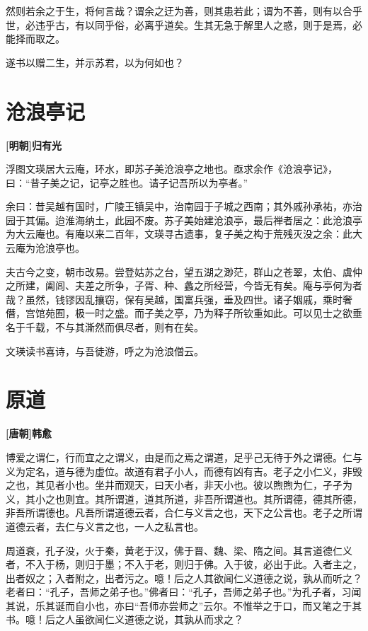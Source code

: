 \documentclass[UTF8,titlepage,oneside]{ctexbook}
\begin{document}
然则若余之于生，将何言哉？谓余之迂为善，则其患若此；谓为不善，则有以合乎世，必违乎古，有以同乎俗，必离乎道矣。生其无急于解里人之惑，则于是焉，必能择而取之。


遂书以赠二生，并示苏君，以为何如也？



\chapter*{沧浪亭记}
\begin{center}
	\textbf{[明朝]归有光}
\end{center}


浮图文瑛居大云庵，环水，即苏子美沧浪亭之地也。亟求余作《沧浪亭记》，曰：“昔子美之记，记亭之胜也。请子记吾所以为亭者。”


余曰：昔吴越有国时，广陵王镇吴中，治南园于子城之西南；其外戚孙承祐，亦治园于其偏。迨淮海纳土，此园不废。苏子美始建沧浪亭，最后禅者居之：此沧浪亭为大云庵也。有庵以来二百年，文瑛寻古遗事，复子美之构于荒残灭没之余：此大云庵为沧浪亭也。


夫古今之变，朝市改易。尝登姑苏之台，望五湖之渺茫，群山之苍翠，太伯、虞仲之所建，阖闾、夫差之所争，子胥、种、蠡之所经营，今皆无有矣。庵与亭何为者哉？虽然，钱镠因乱攘窃，保有吴越，国富兵强，垂及四世。诸子姻戚，乘时奢僭，宫馆苑囿，极一时之盛。而子美之亭，乃为释子所钦重如此。可以见士之欲垂名于千载，不与其澌然而俱尽者，则有在矣。


文瑛读书喜诗，与吾徒游，呼之为沧浪僧云。



\chapter*{原道}
\begin{center}
	\textbf{[唐朝]韩愈}
\end{center}

博爱之谓仁，行而宜之之谓义，由是而之焉之谓道，足乎己无待于外之谓德。仁与义为定名，道与德为虚位。故道有君子小人，而德有凶有吉。老子之小仁义，非毁之也，其见者小也。坐井而观天，曰天小者，非天小也。彼以煦煦为仁，孑孑为义，其小之也则宜。其所谓道，道其所道，非吾所谓道也。其所谓德，德其所德，非吾所谓德也。凡吾所谓道德云者，合仁与义言之也，天下之公言也。老子之所谓道德云者，去仁与义言之也，一人之私言也。

周道衰，孔子没，火于秦，黄老于汉，佛于晋、魏、梁、隋之间。其言道德仁义者，不入于杨，则归于墨；不入于老，则归于佛。入于彼，必出于此。入者主之，出者奴之；入者附之，出者污之。噫！后之人其欲闻仁义道德之说，孰从而听之？老者曰：“孔子，吾师之弟子也。”佛者曰：“孔子，吾师之弟子也。”为孔子者，习闻其说，乐其诞而自小也，亦曰“吾师亦尝师之”云尔。不惟举之于口，而又笔之于其书。噫！后之人虽欲闻仁义道德之说，其孰从而求之？
\end{document}
